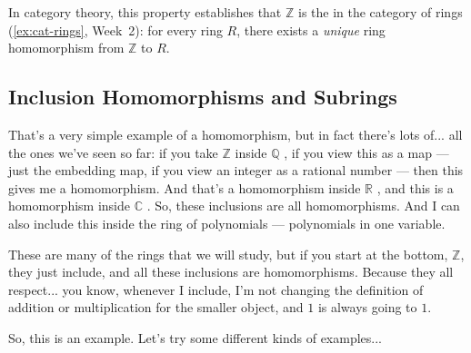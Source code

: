 \begin{content}
\begin{steps}
In category theory, this property establishes that $\mathbb{Z}$ is the  in the category of rings (\cref{ex:cat-rings}, Week~2): for every ring $R$, there exists a \emph{unique} ring homomorphism from $\mathbb{Z}$ to $R$.
\end{steps}
\end{content}

\begin{hidden}
\end{hidden}

\subsection{Inclusion Homomorphisms and Subrings}

\begin{speech}[00:27:20 - 00:28:24]
That's a very simple example of a homomorphism, but in fact there's lots of... all the ones we've seen so far: if you take $\mathbb{Z}$ inside $\mathbb{Q}$ , if you view this as a map --- just the embedding map, if you view an integer as a rational number --- then this gives me a homomorphism. And that's a homomorphism inside $\mathbb{R}$ , and this is a homomorphism inside $\mathbb{C}$ . So, these inclusions are all homomorphisms. And I can also include this inside the ring of polynomials  --- polynomials in one variable.

These are many of the rings that we will study, but if you start at the bottom, $\mathbb{Z}$, they just include, and all these inclusions are homomorphisms. Because they all respect... you know, whenever I include, I'm not changing the definition of addition or multiplication for the smaller object, and $1$ is always going to $1$.

So, this is an example. Let's try some different kinds of examples... 
\end{speech}

